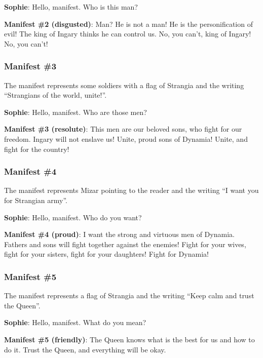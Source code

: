\textbf{Sophie}: Hello, manifest. Who is this man?

\textbf{Manifest \#{}2 (disgusted)}: Man? He is not a man! He is the personification of evil! The king of Ingary thinks he can control us. No, you can't, king of Ingary! No, you can't!

\subsubsection*{Manifest \#{}3}
The manifest represents some soldiers with a flag of Strangia and the writing \enquote{Strangians of the world, unite!}.

\textbf{Sophie}: Hello, manifest. Who are those men?

\textbf{Manifest \#{}3 (resolute)}: This men are our beloved sons, who fight for our freedom. Ingary will not enslave us! Unite, proud sons of Dynamia! Unite, and fight for the country!

\subsubsection*{Manifest \#{}4}
The manifest represents Mizar pointing to the reader and the writing \enquote{I want you for Strangian army}.

\textbf{Sophie}: Hello, manifest. Who do you want?

\textbf{Manifest \#{}4 (proud)}: I want the strong and virtuous men of Dynamia. Fathers and sons will fight together against the enemies! Fight for your wives, fight for your sisters, fight for your daughters! Fight for Dynamia!

%
%

\subsubsection*{Manifest \#{}5}
The manifest represents a flag of Strangia and the writing \enquote{Keep calm and trust the Queen}.

\textbf{Sophie}: Hello, manifest. What do you mean?

\textbf{Manifest \#{}5 (friendly)}: The Queen knows what is the best for us and how to do it. Trust the Queen, and everything will be okay.

